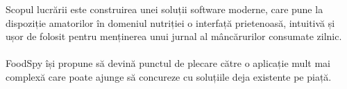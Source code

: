
Scopul lucrării este construirea unei soluții software moderne, care pune la dispoziție amatorilor în domeniul nutriției o interfață prietenoasă, intuitivă și ușor de folosit pentru menținerea unui jurnal al mâncărurilor consumate zilnic.
\\ \\
FoodSpy își propune să devină punctul de plecare către o aplicație mult mai complexă care poate ajunge să concureze cu soluțiile deja existente pe piață.
